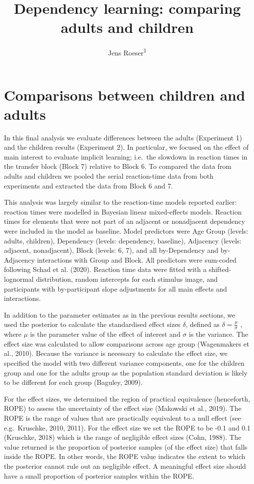 \documentclass[
  english,
  man,floatsintext]{apa7}
\author{Jens Roeser\textsuperscript{1}}
\affiliation{
\vspace{0.5cm}
\textsuperscript{1} Department of Psychology, Nottingham Trent University, United Kingdom}
\title{Dependency learning: comparing adults and children}
\date{}
\begin{document}
\maketitle

\hypertarget{comparisons-between-children-and-adults}{%
\section{Comparisons between children and adults}\label{comparisons-between-children-and-adults}}

In this final analysis we evaluate differences between the adults (Experiment 1) and the children results (Experiment 2). In particular, we focused on the effect of main interest to evaluate implicit learning; i.e.~the slowdown in reaction times in the transfer block (Block 7) relative to Block 6. To compared the data from adults and children we pooled the serial reaction-time data from both experiments and extracted the data from Block 6 and 7.

This analysis was largely similar to the reaction-time models reported earlier: reaction times were modelled in Bayesian linear mixed-effects models. Reaction times for elements that were not part of an adjacent or nonadjacent dependency were included in the model as baseline. Model predictors were Age Group (levels: adults, children), Dependency (levels: dependency, baseline), Adjacency (levels: adjacent, nonadjacent), Block (levels: 6, 7), and all by-Dependency and by-Adjacency interactions with Group and Block. All predictors were sum-coded following Schad et al. (2020). Reaction time data were ﬁtted with a shifted-lognormal distribution, random intercepts for each stimulus image, and participants with by-participant slope adjustments for all main effects and interactions.

In addition to the parameter estimates as in the previous results sections, we used the posterior to calculate the standardised effect sizes \(\delta\), defined as \(\delta = \frac{\mu}{\sigma}\) , where \(\mu\) is the parameter value of the effect of interest and \(\sigma\) is the variance. The effect size was calculated to allow comparisons across age group (Wagenmakers et al., 2010). Because the variance is necessary to calculate the effect size, we specified the model with two different variance components, one for the children group and one for the adults group as the population standard deviation is likely to be different for each group (Baguley, 2009).

For the effect sizes, we determined the region of practical equivalence (henceforth, ROPE) to assess the uncertainty of the effect size (Makowski et al., 2019). The ROPE is the range of values that are practically equivalent to a null effect (see e.g.~Kruschke, 2010, 2011). For the effect size we set the ROPE to be -0.1 and 0.1 (Kruschke, 2018) which is the range of negligible effect sizes (Cohn, 1988). The value returned is the proportion of posterior samples (of the effect size) that falls inside the ROPE. In other words, the ROPE value indicates the extent to which the posterior cannot rule out an negligible effect. A meaningful effect size should have a small proportion of posterior samples within the ROPE.
\end{document}
